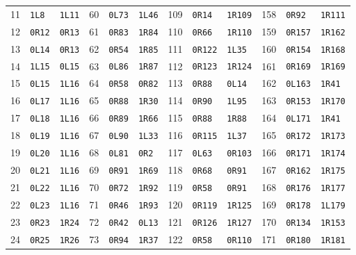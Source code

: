 \begin{center}
\begin{tabular}{rll@{\qquad}rll@{\qquad}rll@{\qquad}rll}
11 & \texttt{1L8} & \texttt{1L11} & 60 & \texttt{0L73} & \texttt{1L46} & 109 & \texttt{0R14} & \texttt{1R109} & 158 & \texttt{0R92} & \texttt{1R111}\\
12 & \texttt{0R12} & \texttt{0R13} & 61 & \texttt{0R83} & \texttt{1R84} & 110 & \texttt{0R66} & \texttt{1R110} & 159 & \texttt{0R157} & \texttt{1R162}\\
13 & \texttt{0L14} & \texttt{0R13} & 62 & \texttt{0R54} & \texttt{1R85} & 111 & \texttt{0R122} & \texttt{1L35} & 160 & \texttt{0R154} & \texttt{1R168}\\
14 & \texttt{1L15} & \texttt{0L15} & 63 & \texttt{0L86} & \texttt{1R87} & 112 & \texttt{0R123} & \texttt{1R124} & 161 & \texttt{0R169} & \texttt{1R169}\\
15 & \texttt{0L15} & \texttt{1L16} & 64 & \texttt{0R58} & \texttt{0R82} & 113 & \texttt{0R88} & \texttt{0L14} & 162 & \texttt{0L163} & \texttt{1R41}\\
16 & \texttt{0L17} & \texttt{1L16} & 65 & \texttt{0R88} & \texttt{1R30} & 114 & \texttt{0R90} & \texttt{1L95} & 163 & \texttt{0R153} & \texttt{1R170}\\
17 & \texttt{0L18} & \texttt{1L16} & 66 & \texttt{0R89} & \texttt{1R66} & 115 & \texttt{0R88} & \texttt{1R88} & 164 & \texttt{0L171} & \texttt{1R41}\\
18 & \texttt{0L19} & \texttt{1L16} & 67 & \texttt{0L90} & \texttt{1L33} & 116 & \texttt{0R115} & \texttt{1L37} & 165 & \texttt{0R172} & \texttt{1R173}\\
19 & \texttt{0L20} & \texttt{1L16} & 68 & \texttt{0L81} & \texttt{0R2} & 117 & \texttt{0L63} & \texttt{0R103} & 166 & \texttt{0R171} & \texttt{1R174}\\
20 & \texttt{0L21} & \texttt{1L16} & 69 & \texttt{0R91} & \texttt{1R69} & 118 & \texttt{0R68} & \texttt{0R91} & 167 & \texttt{0R162} & \texttt{1R175}\\
21 & \texttt{0L22} & \texttt{1L16} & 70 & \texttt{0R72} & \texttt{1R92} & 119 & \texttt{0R58} & \texttt{0R91} & 168 & \texttt{0R176} & \texttt{1R177}\\
22 & \texttt{0L23} & \texttt{1L16} & 71 & \texttt{0R46} & \texttt{1R93} & 120 & \texttt{0R119} & \texttt{1R125} & 169 & \texttt{0R178} & \texttt{1L179}\\
23 & \texttt{0R23} & \texttt{1R24} & 72 & \texttt{0R42} & \texttt{0L13} & 121 & \texttt{0R126} & \texttt{1R127} & 170 & \texttt{0R134} & \texttt{1R153}\\
24 & \texttt{0R25} & \texttt{1R26} & 73 & \texttt{0R94} & \texttt{1R37} & 122 & \texttt{0R58} & \texttt{0R110} & 171 & \texttt{0R180} & \texttt{1R181}\\

\end{tabular}
\end{center}
